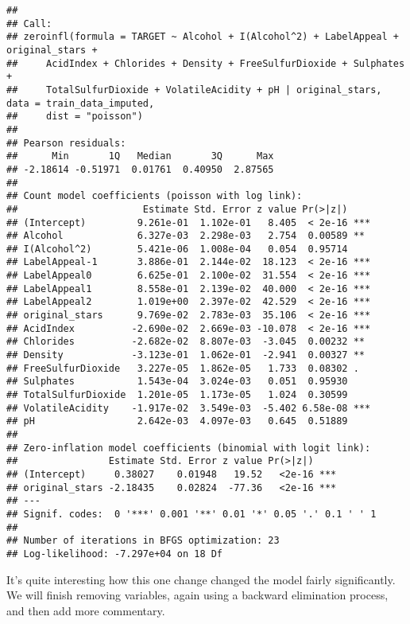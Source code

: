 \documentclass[
]{article}
\begin{document}
\begin{verbatim}
## 
## Call:
## zeroinfl(formula = TARGET ~ Alcohol + I(Alcohol^2) + LabelAppeal + original_stars + 
##     AcidIndex + Chlorides + Density + FreeSulfurDioxide + Sulphates + 
##     TotalSulfurDioxide + VolatileAcidity + pH | original_stars, data = train_data_imputed, 
##     dist = "poisson")
## 
## Pearson residuals:
##      Min       1Q   Median       3Q      Max 
## -2.18614 -0.51971  0.01761  0.40950  2.87565 
## 
## Count model coefficients (poisson with log link):
##                      Estimate Std. Error z value Pr(>|z|)    
## (Intercept)         9.261e-01  1.102e-01   8.405  < 2e-16 ***
## Alcohol             6.327e-03  2.298e-03   2.754  0.00589 ** 
## I(Alcohol^2)        5.421e-06  1.008e-04   0.054  0.95714    
## LabelAppeal-1       3.886e-01  2.144e-02  18.123  < 2e-16 ***
## LabelAppeal0        6.625e-01  2.100e-02  31.554  < 2e-16 ***
## LabelAppeal1        8.558e-01  2.139e-02  40.000  < 2e-16 ***
## LabelAppeal2        1.019e+00  2.397e-02  42.529  < 2e-16 ***
## original_stars      9.769e-02  2.783e-03  35.106  < 2e-16 ***
## AcidIndex          -2.690e-02  2.669e-03 -10.078  < 2e-16 ***
## Chlorides          -2.682e-02  8.807e-03  -3.045  0.00232 ** 
## Density            -3.123e-01  1.062e-01  -2.941  0.00327 ** 
## FreeSulfurDioxide   3.227e-05  1.862e-05   1.733  0.08302 .  
## Sulphates           1.543e-04  3.024e-03   0.051  0.95930    
## TotalSulfurDioxide  1.201e-05  1.173e-05   1.024  0.30599    
## VolatileAcidity    -1.917e-02  3.549e-03  -5.402 6.58e-08 ***
## pH                  2.642e-03  4.097e-03   0.645  0.51889    
## 
## Zero-inflation model coefficients (binomial with logit link):
##                Estimate Std. Error z value Pr(>|z|)    
## (Intercept)     0.38027    0.01948   19.52   <2e-16 ***
## original_stars -2.18435    0.02824  -77.36   <2e-16 ***
## ---
## Signif. codes:  0 '***' 0.001 '**' 0.01 '*' 0.05 '.' 0.1 ' ' 1 
## 
## Number of iterations in BFGS optimization: 23 
## Log-likelihood: -7.297e+04 on 18 Df
\end{verbatim}

It's quite interesting how this one change changed the model fairly
significantly. We will finish removing variables, again using a backward
elimination process, and then add more commentary.
\end{document}
